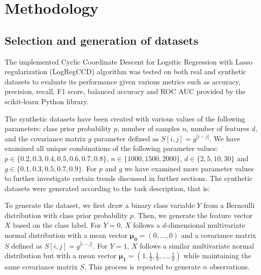 \documentclass[11pt]{article}
\begin{document}
\section{Methodology}

\subsection{Selection and generation of datasets}

The implemented Cyclic Coordinate Descent for Logsitic Regression with Lasso regularization (LogRegCCD) algorithm was tested on both real and synthetic datasets to evaluate its performance given various metrics such as accuracy, precision, recall, F1 score, balanced accuracy and ROC AUC \cite{powers2011evaluation, brodersen2010balanced, fawcett2006introduction} provided by the scikit-learn \cite{scikit-learn} Python \cite{python} library. \par 



The synthetic datasets have been created with various values of the following parameters: class prior probability $p$, number of samples $n$, number of features $d$, and the covariance matrix $g$ parameter defined as $S[i,j] = g^{|i-j|}$. We have examined all unique combinations of the following parameter values: $p \in \{0.2, 0.3, 0.4, 0.5, 0.6, 0.7, 0.8\}$, $n \in \{1000, 1500, 2000\}$, $d \in \{2, 5, 10, 30\}$ and $g \in \{0.1, 0.3, 0.5, 0.7, 0.9\}$. For $p$ and $g$ we have examined more parameter values to further investigate certain trends discussed in further sections. The synthetic datasets were generated according to the task description, that is:

To generate the dataset, we first draw a binary class variable $Y$ from a Bernoulli distribution with class prior probability $p$. Then, we generate the feature vector $X$ based on the class label. For $Y = 0$, $X$ follows a $d$-dimensional multivariate normal distribution with a mean vector $\boldsymbol{\mu_0} = (0, \dots, 0)$ and a covariance matrix $S$ defined as $S[i,j] = g^{|i-j|}$. For $Y = 1$, $X$ follows a similar multivariate normal distribution but with a mean vector $\boldsymbol{\mu_1} = \left(1, \frac{1}{2}, \frac{1}{3}, \dots, \frac{1}{d} \right)$ while maintaining the same covariance matrix $S$. This process is repeated to generate $n$ observations.
\end{document}
